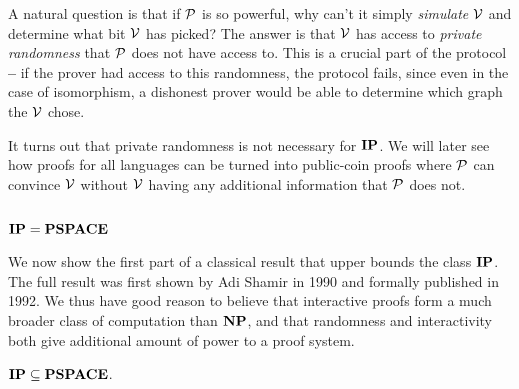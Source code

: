 \vspace{2mm}

A natural question is that if $\mathcal{P}$ is so powerful, why can't it simply \textit{simulate} $\mathcal{V}$ and determine what bit $\mathcal{V}$ has picked? The answer is that $\mathcal{V}$ has access to \textit{private randomness} that $\mathcal{P}$ does not have access to. This is a crucial part of the protocol \textbf{--} if the prover had access to this randomness, the protocol fails, since even in the case of isomorphism, a dishonest prover would be able to determine which graph the $\mathcal{V}$ chose.

It turns out that private randomness is not necessary for $\mathbf{IP}$. We will later see how proofs for all languages can be turned into public-coin proofs where $\mathcal{P}$ can convince $\mathcal{V}$ without $\mathcal{V}$ having any additional information that $\mathcal{P}$ does not.

\subsection{$\mathbf{IP}=\mathbf{PSPACE}$}

We now show the first part of a classical result that upper bounds the class $\mathbf{IP}$. The full result was first shown by Adi Shamir \cite{10.1145/146585.146609} in 1990 and formally published in 1992. We thus have good reason to believe that interactive proofs form a much broader class of computation than $\mathbf{NP}$, and that randomness and interactivity both give additional amount of power to a proof system.

\begin{theorem}
	\label{thm:ipsubsetpspace}
	$\mathbf{IP}\subseteq\mathbf{PSPACE}$.
\end{theorem}

